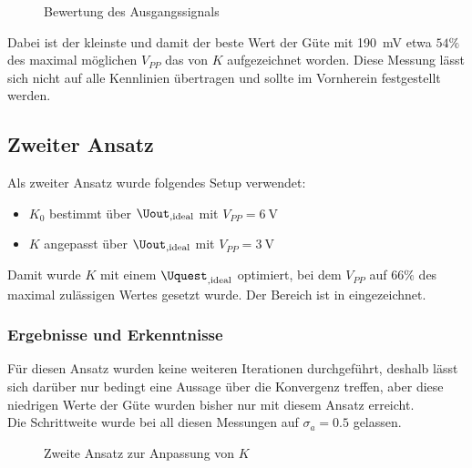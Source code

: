 \documentclass[../Report.tex]{subfiles}
\begin{document}
\begin{figure}[H]
\begin{subfigure}{0.5 \textwidth}
	\setlength\figureheight{8cm}
	\setlength\figurewidth{8cm}
    	
	\label{fig:K0_quality}
\end{subfigure}
\begin{subfigure}{0.5 \textwidth}
	\setlength\figureheight{8cm}
	\setlength\figurewidth{8cm}
    	
	\label{fig:evaluateK.quality}
\end{subfigure}
\caption{Bewertung des Ausgangssignals}
\label{fig:evaluateK}
\end{figure}
Dabei ist der kleinste und damit der beste Wert der Güte mit \SI{190}{\mV} etwa $54\%$ des maximal möglichen $V_{PP}$ das von $K$ aufgezeichnet worden. Diese Messung lässt sich nicht auf alle Kennlinien übertragen und sollte im Vornherein festgestellt werden.

\subsection{Zweiter Ansatz}
\label{subsubsec:opt.adjusta.kleiner}
Als zweiter Ansatz wurde folgendes Setup verwendet:
\begin{itemize}
	\item $K_0$ bestimmt über $\Uout_{,\textrm{ideal}}$ mit $V_{PP} = \SI{6}{\V}$
	\item $K$ angepasst über $\Uout_{,\textrm{ideal}}$ mit $V_{PP} = \SI{3}{\V}$
\end{itemize}
Damit wurde $K$ mit einem $\Uquest_{,\textrm{ideal}}$ optimiert, bei dem $V_{PP}$ auf $66\%$ des maximal zulässigen Wertes gesetzt wurde. Der Bereich ist in  eingezeichnet.
\subsubsection*{Ergebnisse und Erkenntnisse}
\label{subsubsec:opt.adjusta.kleiner.results}
Für diesen Ansatz wurden keine weiteren Iterationen durchgeführt, deshalb lässt sich darüber nur bedingt eine Aussage über die Konvergenz treffen, aber diese niedrigen Werte der Güte wurden bisher nur mit diesem Ansatz erreicht.\\
Die Schrittweite wurde bei all diesen Messungen auf $\sigma_a = 0.5$ gelassen.
\begin{figure}[H]
\begin{subfigure}{0.5 \textwidth}
	\setlength\figureheight{8cm}
	\setlength\figurewidth{8cm}
    
	\label{fig:opt.kleinerBereich.K}
\end{subfigure}
\begin{subfigure}{0.5 \textwidth}
	\setlength\figureheight{8cm}
	\setlength\figurewidth{8cm}
    
	\label{fig:opt.kleinerBereich.Q}
\end{subfigure}
\label{fig:opt.Kennlinie}
\caption{Zweite Ansatz zur Anpassung von $K$}
\end{figure}
\end{document}
